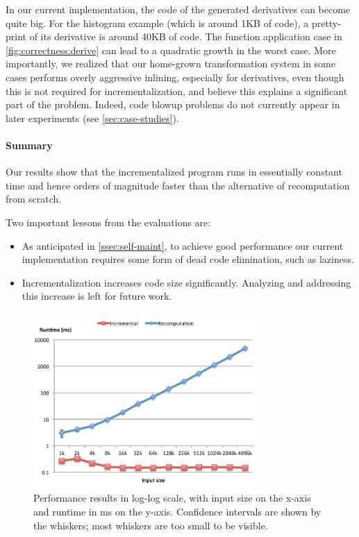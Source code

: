In our current implementation, the code of the generated
derivatives can become quite big. For the histogram example
(which is around 1KB of code), a pretty-print of its derivative
is around 40KB of code. The function application case in
\cref{fig:correctness:derive} can lead to a quadratic growth in
the worst case. More importantly, we realized that our home-grown
transformation system in some cases performs overly aggressive
inlining, especially for derivatives, even though this is not
required for incrementalization, and believe this explains a
significant part of the problem. Indeed, code blowup problems do
not currently appear in later experiments (see
\cref{sec:case-studies}).

\paragraph{Summary}
Our results show that the incrementalized program runs
in essentially constant time and hence orders of magnitude faster than
the alternative of recomputation from scratch.

Two important lessons from the evaluations are:
\begin{itemize}
\item As anticipated in \cref{ssec:self-maint}, to achieve good performance our current
  implementation requires some form of dead code elimination, such as laziness.
\item Incrementalization increases code size significantly.
  Analyzing and addressing this increase is left for future work.
\end{itemize}

\begin{figure}
\includegraphics[keepaspectratio,width=8.5cm]{pldi14/HistogramGenerated-new.pdf}
\caption{Performance results in log-log scale, with input size on
  the x-axis and runtime in ms on the y-axis. Confidence
  intervals are shown by the whiskers; most whiskers are
  too small to be visible.}
\label{fig:graph}
\end{figure}
